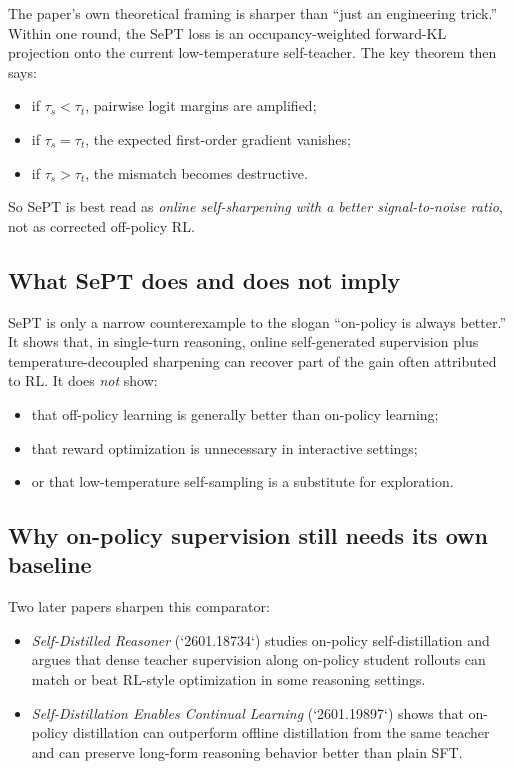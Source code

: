 \documentclass[11pt]{article}
\begin{document}
The paper's own theoretical framing is sharper than ``just an engineering trick.'' Within one round, the SePT loss is an occupancy-weighted forward-KL projection onto the current low-temperature self-teacher. The key theorem then says:

\begin{itemize}
\item if $\tau_s < \tau_t$, pairwise logit margins are amplified;
\item if $\tau_s = \tau_t$, the expected first-order gradient vanishes;
\item if $\tau_s > \tau_t$, the mismatch becomes destructive.
\end{itemize}

So SePT is best read as \emph{online self-sharpening with a better signal-to-noise ratio}, not as corrected off-policy RL.

\subsection*{What SePT does and does not imply}

SePT is only a narrow counterexample to the slogan ``on-policy is always better.'' It shows that, in single-turn reasoning, online self-generated supervision plus temperature-decoupled sharpening can recover part of the gain often attributed to RL. It does \emph{not} show:

\begin{itemize}
\item that off-policy learning is generally better than on-policy learning;
\item that reward optimization is unnecessary in interactive settings;
\item or that low-temperature self-sampling is a substitute for exploration.
\end{itemize}

\subsection*{Why on-policy supervision still needs its own baseline}

Two later papers sharpen this comparator:

\begin{itemize}
\item \emph{Self-Distilled Reasoner} (`2601.18734`) studies on-policy self-distillation and argues that dense teacher supervision along on-policy student rollouts can match or beat RL-style optimization in some reasoning settings.
\item \emph{Self-Distillation Enables Continual Learning} (`2601.19897`) shows that on-policy distillation can outperform offline distillation from the same teacher and can preserve long-form reasoning behavior better than plain SFT.
\end{itemize}
\end{document}
